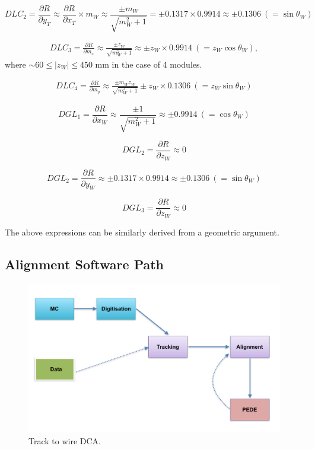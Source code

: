 \documentclass[a4paper,11pt]{article}
\begin{document}
\begin{equation}
DLC_2 = \frac{ \partial R}{\partial y_T} \approx   \frac{ \partial R}{\partial x_T} \times m_W \approx \frac{\pm m_W}{\sqrt{m_W^2+1}} = \pm 0.1317 \times 0.9914 \approx \pm 0.1306 \ (= \sin\theta_W)
\end{equation}


\begin{equation}
\begin{split}
DLC_3 = \frac{ \partial R}{\partial m_x} \approx \frac{\pm z_W}{\sqrt{m_W^2+1}} \approx \pm z_W \times 0.9914 \ (= z_W\cos\theta_W),
\end{split}
\end{equation}
where $ \sim 60 \leq |z_W| \leq 450$ mm in the case of 4 modules. 

\begin{equation}
\begin{split}
DLC_4 = \frac{ \partial R}{\partial m_y} \approx \frac{\pm m_W z_W}{\sqrt{m_W^2+1}} \pm z_W \times 0.1306 \ (= z_W\sin\theta_W)
\end{split}
\end{equation}


\begin{equation}	
DGL_1 = \frac{\partial R}{\partial x_W} \approx  \frac{\pm1}{\sqrt{m_W^2+1}} \approx \pm 0.9914 \ (= \cos\theta_W)
\end{equation}

\begin{equation}	
DGL_2 = \frac{\partial R}{\partial z_W} \approx  0
\end{equation}


\begin{equation}	
DGL_2 = \frac{\partial R}{\partial y_W} \approx \pm 0.1317 \times 0.9914 \approx \pm 0.1306 \ (= \sin\theta_W)
\end{equation}

\begin{equation}	
DGL_3 = \frac{\partial R}{\partial z_W} \approx  0
\end{equation}

The above expressions can be similarly derived from a geometric argument. 

\subsection{Alignment Software Path}

\begin{figure}[!ht]
\centering
\includegraphics[width=0.4\linewidth]{fig/AlignPath.png}
\caption{Track to wire DCA.}
\label{fig:AlignPath}
\end{figure}
\end{document}
